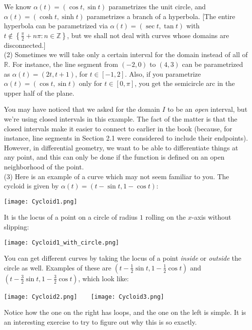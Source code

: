\documentclass[leqno]{book}
\begin{document}
We know $\alpha(t)=(\cos t,\sin t)$ parametrizes the unit circle, and $\alpha(t)=(\cosh t,\sinh t)$ parametrizes a branch of a hyperbola.  [The entire hyperbola can be parametrized via $\alpha(t)=(\sec t,\tan t)$ with $t\notin\left\{\frac{\pi}2+n\pi:n\in\mathbb Z\right\}$, but we shall not deal with curves whose domains are disconnected.]\\

(2) Sometimes we will take only a certain interval for the domain instead of all of $\mathbb R$.  For instance, the line segment from $(-2,0)$ to $(4,3)$ can be parametrized as $\alpha(t)=(2t,t+1)$, for $t\in[-1,2]$.  Also, if you parametrize $\alpha(t)=(\cos t,\sin t)$ only for $t\in[0,\pi]$, you get the semicircle arc in the upper half of the plane.

You may have noticed that we asked for the domain $I$ to be an \emph{open} interval, but we're using closed intervals in this example.  The fact of the matter is that the closed intervals make it easier to connect to earlier in the book (because, for instance, line segments in Section 2.1 were considered to include their endpoints).  However, in differential geometry, we want to be able to differentiate things at any point, and this can only be done if the function is defined on an open neighborhood of the point.\\

(3) Here is an example of a curve which may not seem familiar to you.  The cycloid is given by $\alpha(t)=(t-\sin t,1-\cos t)$:
\begin{center}
\texttt{[image: Cycloid1.png]}
\end{center}
It is the locus of a point on a circle of radius $1$ rolling on the $x$-axis without slipping:
\begin{center}
\texttt{[image: Cycloid1\_with\_circle.png]}
\end{center}
You can get different curves by taking the locus of a point \emph{inside} or \emph{outside} the circle as well.  Examples of these are $\left(t-\frac 12\sin t,1-\frac 12\cos t\right)$ and $\left(t-\frac 32\sin t,1-\frac 32\cos t\right)$, which look like:
\begin{center}
\texttt{[image: Cycloid2.png]}~~~~\texttt{[image: Cycloid3.png]}
\end{center}
Notice how the one on the right has loops, and the one on the left is simple.  It is an interesting exercise to try to figure out why this is so exactly.\\
\end{document}
